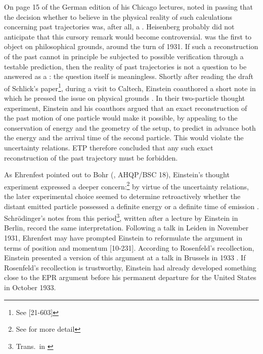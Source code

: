 \documentclass[pdflatex]{sn-jnl}
\renewcommand{\cite}{\citealp}
\newcommand{\UR}{uncertainty relations\xspace}
\begin{document}
On page 15 of the German edition of his Chicago lectures, \citet[15]{Heisenberg1930} noted in passing that the decision whether to believe in the physical reality of such calculations concerning past trajectories was, after all, a  . Heisenberg probably did not anticipate that this cursory remark would become controversial. \citet{Schlick1931} was the first to object on philosophical grounds, around the turn of 1931. If such a reconstruction of the past cannot in principle be subjected to possible verification through a testable prediction, then the reality of past trajectories is not a question to be answered as a : the question itself is meaningless. Shortly after reading the draft of Schlick's paper\footnote{See [21-603]}, during a visit to Caltech, Einstein coauthored a short note in which he pressed the issue on physical grounds \citep{Einstein1931-03}. In their two-particle thought experiment, Einstein and his coauthors argued that an exact reconstruction of the past motion of one particle would make it possible, by appealing to the conservation of energy and the geometry of the setup, to predict in advance both the energy and the arrival time of the second particle. This would violate the \UR. ETP therefore concluded that any such exact reconstruction of the past trajectory must be forbidden.

As Ehrenfest pointed out to Bohr (, AHQP/BSC 18), Einstein's thought experiment expressed a deeper concern:\footnote{See \cite[Ch.~1]{BacciagaluppiCrull2024} for more detail} by virtue of the \UR, the later experimental choice seemed to determine retroactively whether the distant emitted particle possessed a definite energy or a definite time of emission \citep[see also][]{Einstein1932d}. Schrödinger's notes from this period\footnote{Trans.\ in \cite[153--154]{BacciagaluppiCrull2024}}, written after a lecture by Einstein in Berlin, record the same interpretation. Following a talk in Leiden in November 1931, Ehrenfest may have prompted Einstein to reformulate the argument in terms of position and momentum [10-231]. According to Rosenfeld's recollection, Einstein presented a version of this argument at a talk in Brussels in 1933 \citep[127--28]{Rosenfeld1967}. If Rosenfeld's recollection is trustworthy, Einstein had already developed something close to the EPR argument before his permanent departure for the United States in October 1933.
\end{document}

